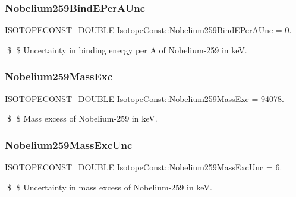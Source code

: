 \subsubsection{\texorpdfstring{Nobelium259\+Bind\+E\+Per\+A\+Unc}{Nobelium259BindEPerAUnc}}
{\footnotesize\ttfamily \mbox{\hyperlink{group___isotope_const-_macros_ga8f45a7272ce02c0b4c65c44636ed719a}{I\+S\+O\+T\+O\+P\+E\+C\+O\+N\+S\+T\+\_\+\+D\+O\+U\+B\+LE}} Isotope\+Const\+::\+Nobelium259\+Bind\+E\+Per\+A\+Unc = 0.}

\$ \$ Uncertainty in binding energy per A of Nobelium-\/259 in keV. \mbox{\label{group___isotope_const-_nobelium-_no259_ga97416170d03cad7b772626c19e2cb394}} 
\subsubsection{\texorpdfstring{Nobelium259\+Mass\+Exc}{Nobelium259MassExc}}
{\footnotesize\ttfamily \mbox{\hyperlink{group___isotope_const-_macros_ga8f45a7272ce02c0b4c65c44636ed719a}{I\+S\+O\+T\+O\+P\+E\+C\+O\+N\+S\+T\+\_\+\+D\+O\+U\+B\+LE}} Isotope\+Const\+::\+Nobelium259\+Mass\+Exc = 94078.}

\$ \$ Mass excess of Nobelium-\/259 in keV. \mbox{\label{group___isotope_const-_nobelium-_no259_ga44612406d3c15015e0f7fcbb86c392ec}} 
\subsubsection{\texorpdfstring{Nobelium259\+Mass\+Exc\+Unc}{Nobelium259MassExcUnc}}
{\footnotesize\ttfamily \mbox{\hyperlink{group___isotope_const-_macros_ga8f45a7272ce02c0b4c65c44636ed719a}{I\+S\+O\+T\+O\+P\+E\+C\+O\+N\+S\+T\+\_\+\+D\+O\+U\+B\+LE}} Isotope\+Const\+::\+Nobelium259\+Mass\+Exc\+Unc = 6.}

\$ \$ Uncertainty in mass excess of Nobelium-\/259 in keV. \mbox{\label{group___isotope_const-_nobelium-_no259_gab123ae1fcedfa2488dfb90f17f2bd390}} 

